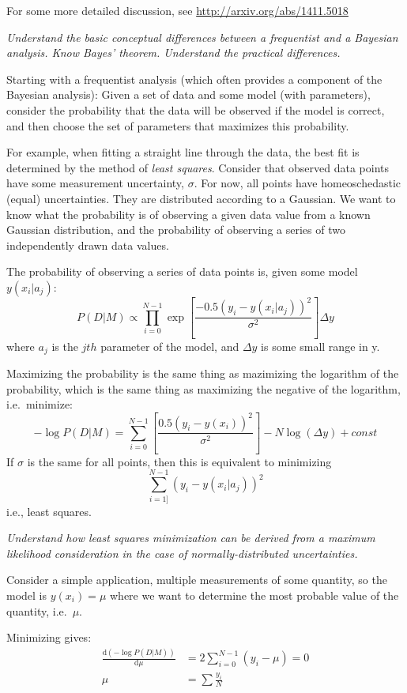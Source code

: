 \documentclass[12pt]{article}
\begin{document}
For some more detailed discussion, see
\url{http://arxiv.org/abs/1411.5018}

\colorbox{hl}{\parbox{0.9\textwidth}
{\emph{Understand the basic conceptual differences between a frequentist
        and a Bayesian analysis. Know Bayes' theorem. Understand the practical
       differences.}}}

Starting with a frequentist analysis (which often provides a component of the
Bayesian analysis): Given a set of data and some model (with parameters),
consider the probability that the data will be observed if the model is correct,
and then choose the set of parameters that maximizes this probability.

For example, when fitting a straight line through the data, the best fit is
determined by the method of \emph{least squares}.
Consider that observed data points have some measurement uncertainty,
$\sigma$. For now, all points have homeoschedastic (equal) uncertainties.
They are distributed according to a Gaussian. We want
to know what the probability is of observing a given data value from a known
Gaussian distribution, and the probability of observing a series of two
independently drawn data values.

The probability of observing a series of data points is, given some model
$y(x_i|a_j)$:
$$    P(D|M) \propto \prod^{N-1}_{i=0}\exp
    \left[\frac{-0.5(y_i-y(x_i|a_j))^2}
    {\sigma^2}\right]\Delta y $$
where $a_j$ is the $jth$ parameter of the model, and $\Delta y$ is some small
range in y.

Maximizing the probability is the same thing as mazimizing the logarithm of
the probability, which is the same thing as maximizing the negative of the
logarithm, i.e.\ minimize:
    $$ -\log P(D|M) = \sum^{N-1}_{i=0}\left[\frac
        {0.5(y_i-y(x_i))^2}{\sigma^2}\right]
        -N\log(\Delta y) + const $$
If $\sigma$ is the same for all points, then this is equivalent to minimizing
    $$ \sum^{N-1}_{i=1]}(y_i-y(x_i|a_j))^2 $$
i.e., least squares.

\colorbox{hl}{\parbox{0.9\textwidth}
{\emph{Understand how least squares minimization can be derived from a maximum
        likelihood consideration in the case of normally-distributed
        uncertainties.}}}

Consider a simple application, multiple measurements of some quantity, so the
model is $y(x_i) = \mu$ where we want to determine the most probable value of
the quantity, i.e.\ $\mu$.

Minimizing gives:
\begin{align*}
    \frac{\mathrm{d}(-\log P(D|M))}{\mathrm{d}\mu}
    &= 2\sum^{N-1}_{i=0}(y_i-\mu) = 0 \\
    \mu &= \sum \frac{y_i}{N}
\end{align*}
\end{document}
